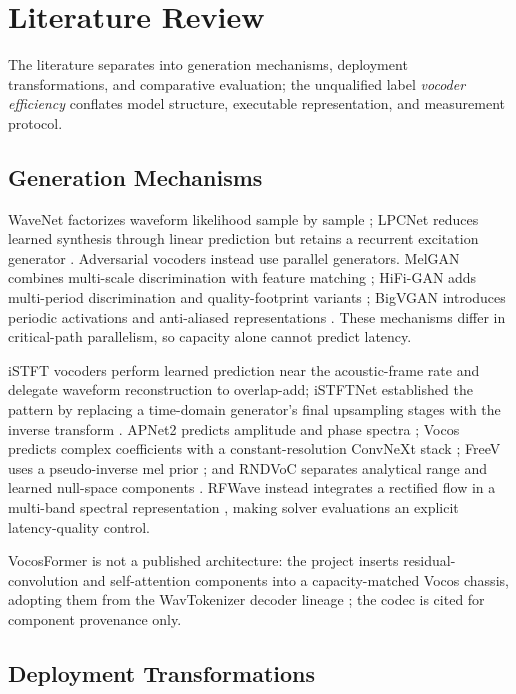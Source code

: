 \section{Literature Review}
\label{sec:literature-review}

The literature separates into generation mechanisms, deployment
transformations, and comparative evaluation; the unqualified label
\emph{vocoder efficiency} conflates model structure, executable
representation, and measurement protocol.

\subsection{Generation Mechanisms}

WaveNet factorizes waveform likelihood sample by sample
\citep{oord2016wavenet}; LPCNet reduces learned synthesis through linear
prediction but retains a recurrent excitation generator
\citep{valin2019lpcnet}.  Adversarial vocoders instead use parallel
generators.  MelGAN combines multi-scale discrimination with feature matching
\citep{kumar2019melgan}; HiFi-GAN adds multi-period discrimination and
quality-footprint variants \citep{kong2020hifigan}; BigVGAN introduces
periodic activations and anti-aliased representations
\citep{lee2023bigvgan}.  These mechanisms differ in critical-path
parallelism, so capacity alone cannot predict latency.

iSTFT vocoders perform learned prediction near the acoustic-frame rate and
delegate waveform reconstruction to overlap-add; iSTFTNet established the
pattern by replacing a time-domain generator's final upsampling stages
with the inverse transform \citep{kaneko2022istftnet}.  APNet2 predicts amplitude
and phase spectra \citep{du2023apnet2}; Vocos predicts complex coefficients
with a constant-resolution ConvNeXt stack \citep{siuzdak2024vocos}; FreeV
uses a pseudo-inverse mel prior \citep{lv2024freev}; and RNDVoC separates
analytical range and learned null-space components \citep{li2025rndvoc}.
RFWave instead integrates a rectified flow in a multi-band spectral
representation \citep{liu2025rfwave}, making solver evaluations an explicit
latency-quality control.

VocosFormer is not a published architecture: the project inserts
residual-convolution and self-attention components into a capacity-matched
Vocos chassis, adopting them from the WavTokenizer decoder lineage
\citep{ji2025wavtokenizer}; the codec is cited for component provenance
only.

\subsection{Deployment Transformations}

